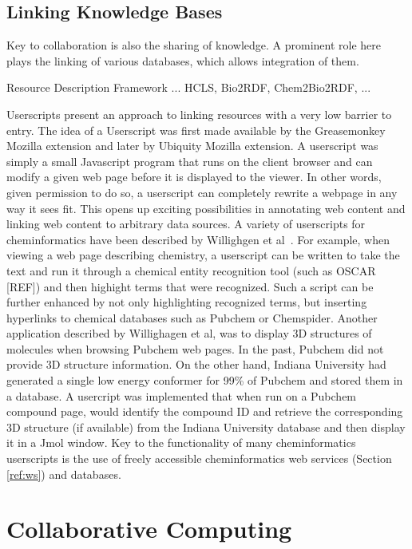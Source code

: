 \documentclass[12pt]{book}
\begin{document}
\subsection{Linking Knowledge Bases}

Key to collaboration is also the sharing of knowledge. A prominent role here
plays the linking of various databases, which allows integration of them.

Resource Description Framework ... HCLS, Bio2RDF, Chem2Bio2RDF, ...

Userscripts present an approach to linking resources with a very low
barrier to entry. The idea of a Userscript was first made available by
the Greasemonkey Mozilla extension and later by Ubiquity Mozilla
extension. A userscript was simply a small Javascript program that
runs on the client browser and can modify a given web page before it
is displayed to the viewer. In other words, given permission to do so,
a userscript can completely rewrite a webpage in any way it sees
fit. This opens up exciting possibilities in annotating web content
and linking web content to arbitrary data sources. A variety of
userscripts for cheminformatics have been described by Willighgen et
al~\cite{Willighagen2007b}. For example, when viewing a web page describing
chemistry, a userscript can be written to take the text and run it
through a chemical entity recognition tool (such as OSCAR [REF]) and
then highight terms that were recognized. Such a script can be further
enhanced by not only highlighting recognized terms, but inserting
hyperlinks to chemical databases such as Pubchem or
Chemspider. Another application described by Willighagen et al, was to
display 3D structures of molecules when browsing Pubchem web pages. In
the past, Pubchem did not provide 3D structure information. On the
other hand, Indiana University had generated a single low energy
conformer for 99\% of Pubchem and stored them in a database. A
usercript was implemented that when run on a Pubchem compound page,
would identify the compound ID and retrieve the corresponding 3D
structure (if available) from the Indiana University database and then
display it in a Jmol window. Key to the functionality of many
cheminformatics userscripts is the use of freely accessible
cheminformatics web services (Section \ref{ref:ws}) and databases.

\section{Collaborative Computing}
\end{document}
